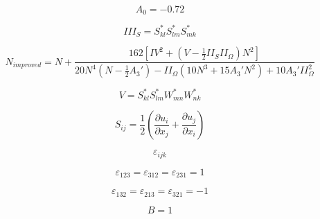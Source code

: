 {\newpage\clearpage
{}%
\begin{displaymath}
A_0 = -0.72
\end{displaymath}%
\lthtmldisplayZ
\lthtmlcheckvsize\clearpage}

{\newpage\clearpage
{}%
\begin{displaymath}
III_S = S_{kl}^* S_{lm}^* S_{mk}^*
\end{displaymath}%
\lthtmldisplayZ
\lthtmlcheckvsize\clearpage}

{\newpage\clearpage
{}%
\begin{displaymath}
N_{improved} = N + \frac{162 \left[ IV^2 + \left( V - \frac{1}{2} II_S II_{\Omega} \right) N^2 \right]}
  {20 N^4 \left( N - \frac{1}{2} A_3' \right) - II_{\Omega} \left( 10 N^3 + 15 A_3' N^2 \right)
  + 10 A_3' II_{\Omega}^2}
\end{displaymath}%
\lthtmldisplayZ
\lthtmlcheckvsize\clearpage}

{\newpage\clearpage
{}%
\begin{displaymath}
V = S_{kl}^* S_{lm}^* W_{mn}^* W_{nk}^*
\end{displaymath}%
\lthtmldisplayZ
\lthtmlcheckvsize\clearpage}

{\newpage\clearpage
{}%
\begin{displaymath}
S_{ij} = \frac{1}{2} \left( \frac{\partial u_i}{\partial x_j} + \frac{\partial u_j}{\partial x_i} \right)
\end{displaymath}%
\lthtmldisplayZ
\lthtmlcheckvsize\clearpage}

{\newpage\clearpage
{}%
\begin{displaymath}
\varepsilon_{ijk}
\end{displaymath}%
\lthtmldisplayZ
\lthtmlcheckvsize\clearpage}

{\newpage\clearpage
{}%
\begin{displaymath}
\varepsilon_{123} = \varepsilon_{312} = \varepsilon_{231} = 1
\end{displaymath}%
\lthtmldisplayZ
\lthtmlcheckvsize\clearpage}

{\newpage\clearpage
{}%
\begin{displaymath}
\varepsilon_{132} = \varepsilon_{213} = \varepsilon_{321} = -1
\end{displaymath}%
\lthtmldisplayZ
\lthtmlcheckvsize\clearpage}

{\newpage\clearpage
{}%
\begin{displaymath}
B=1
\end{displaymath}%
\lthtmldisplayZ
\lthtmlcheckvsize\clearpage}



